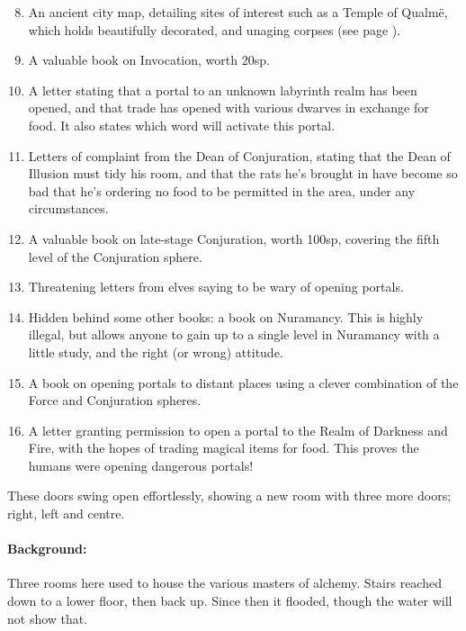 \begin{multicols}{2}
\begin{enumerate}
\setcounter{enumi}{7}
  \item
  An ancient city map, detailing sites of interest such as a Temple of Qualm\"{e}, which holds beautifully decorated, and unaging corpses (see page \pageref{green_tower}).
  \item
  A valuable book on Invocation, worth 20sp.
  \item
  A letter stating that a portal to an unknown labyrinth realm has been opened, and that trade has opened with various dwarves in exchange for food.  It also states which word will activate this portal.
  \item
  Letters of complaint from the Dean of Conjuration, stating that the Dean of Illusion must tidy his room, and that the rats he's brought in have become so bad that he's ordering no food to be permitted in the area, under any circumstances.
  \item
  A valuable book on late-stage Conjuration, worth 100sp, covering the fifth level of the Conjuration sphere.
  \item
  Threatening letters from elves saying to be wary of opening portals.
  \item
  Hidden behind some other books: a book on Nuramancy.  This is highly illegal, but allows anyone to gain up to a single level in Nuramancy with a little study, and the right (or wrong) attitude.
  \item
  A book on opening portals to distant places using a clever combination of the Force and Conjuration spheres.
  \item
  A letter granting permission to open a portal to the Realm of Darkness and Fire, with the hopes of trading magical items for food.
  This proves the humans were opening dangerous portals!

\end{enumerate}


\begin{boxtext}
  These doors swing open effortlessly, showing a new room with three more doors; right, left and centre.

\end{boxtext}

\paragraph{Background:}
Three rooms here used to house the various masters of alchemy.
Stairs reached down to a lower floor, then back up.
Since then it flooded, though the water will not show that.


\end{multicols}
